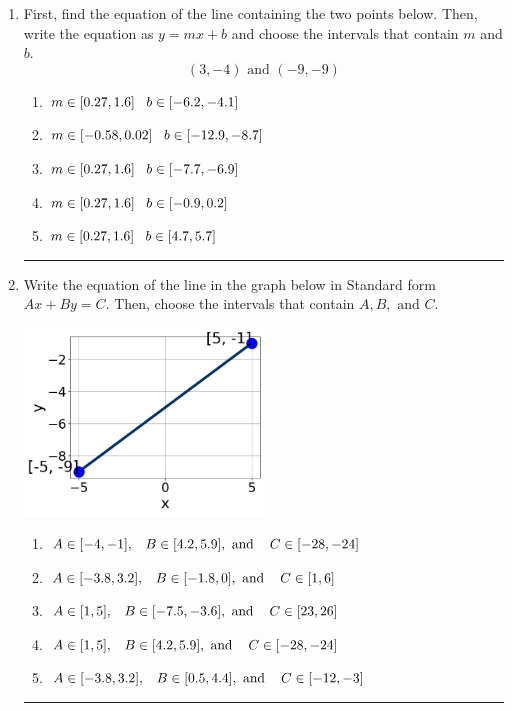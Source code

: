 \documentclass[14pt]{extbook}
\newcommand{\litem}[1]{\item#1\hspace*{-1cm}\rule{\textwidth}{0.4pt}}
\begin{document}
\begin{enumerate}
\litem{
First, find the equation of the line containing the two points below. Then, write the equation as $ y=mx+b $ and choose the intervals that contain $m$ and $b$.\[ (3, -4) \text{ and } (-9, -9) \]\begin{enumerate}[label=\Alph*.]
\item \( m \in [0.27, 1.6] \hspace*{3mm} b \in [-6.2, -4.1] \)
\item \( m \in [-0.58, 0.02] \hspace*{3mm} b \in [-12.9, -8.7] \)
\item \( m \in [0.27, 1.6] \hspace*{3mm} b \in [-7.7, -6.9] \)
\item \( m \in [0.27, 1.6] \hspace*{3mm} b \in [-0.9, 0.2] \)
\item \( m \in [0.27, 1.6] \hspace*{3mm} b \in [4.7, 5.7] \)

\end{enumerate} }
\litem{
Write the equation of the line in the graph below in Standard form $Ax+By=C$. Then, choose the intervals that contain $A, B, \text{ and } C$.
\begin{center}
    \includegraphics[width=0.5\textwidth]{../Figures/linearGraphToStandardCopyA.png}
\end{center}
\begin{enumerate}[label=\Alph*.]
\item \( A \in [-4, -1], \hspace{3mm} B \in [4.2, 5.9], \text{ and } \hspace{3mm} C \in [-28, -24] \)
\item \( A \in [-3.8, 3.2], \hspace{3mm} B \in [-1.8, 0], \text{ and } \hspace{3mm} C \in [1, 6] \)
\item \( A \in [1, 5], \hspace{3mm} B \in [-7.5, -3.6], \text{ and } \hspace{3mm} C \in [23, 26] \)
\item \( A \in [1, 5], \hspace{3mm} B \in [4.2, 5.9], \text{ and } \hspace{3mm} C \in [-28, -24] \)
\item \( A \in [-3.8, 3.2], \hspace{3mm} B \in [0.5, 4.4], \text{ and } \hspace{3mm} C \in [-12, -3] \)


\end{enumerate}}
\end{enumerate}
\end{document}
